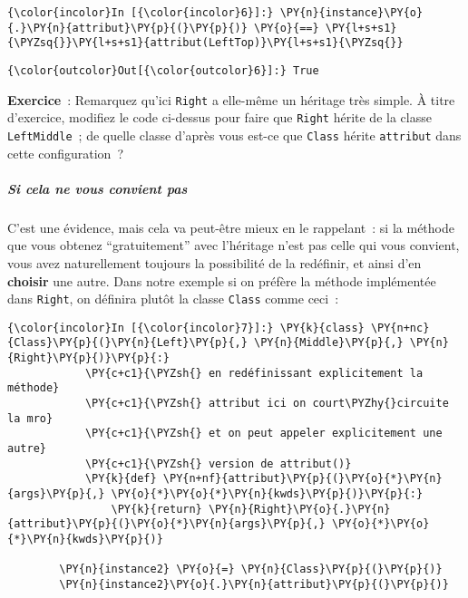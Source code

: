     \begin{Verbatim}[commandchars=\\\{\}]
{\color{incolor}In [{\color{incolor}6}]:} \PY{n}{instance}\PY{o}{.}\PY{n}{attribut}\PY{p}{(}\PY{p}{)} \PY{o}{==} \PY{l+s+s1}{\PYZsq{}}\PY{l+s+s1}{attribut(LeftTop)}\PY{l+s+s1}{\PYZsq{}}
\end{Verbatim}


\begin{Verbatim}[commandchars=\\\{\}]
{\color{outcolor}Out[{\color{outcolor}6}]:} True
\end{Verbatim}
            
    \textbf{Exercice}~: Remarquez qu'ici \texttt{Right} a elle-même un
héritage très simple. À titre d'exercice, modifiez le code ci-dessus
pour faire que \texttt{Right} hérite de la classe \texttt{LeftMiddle}~;
de quelle classe d'après vous est-ce que \texttt{Class} hérite
\texttt{attribut} dans cette configuration~?

    \hypertarget{si-cela-ne-vous-convient-pas}{%
\subparagraph{Si cela ne vous convient
pas}\label{si-cela-ne-vous-convient-pas}}

    C'est une évidence, mais cela va peut-être mieux en le rappelant~: si la
méthode que vous obtenez ``gratuitement'' avec l'héritage n'est pas
celle qui vous convient, vous avez naturellement toujours la possibilité
de la redéfinir, et ainsi d'en \textbf{choisir} une autre. Dans notre
exemple si on préfère la méthode implémentée dans \texttt{Right}, on
définira plutôt la classe \texttt{Class} comme ceci~:

    \begin{Verbatim}[commandchars=\\\{\}]
{\color{incolor}In [{\color{incolor}7}]:} \PY{k}{class} \PY{n+nc}{Class}\PY{p}{(}\PY{n}{Left}\PY{p}{,} \PY{n}{Middle}\PY{p}{,} \PY{n}{Right}\PY{p}{)}\PY{p}{:}
            \PY{c+c1}{\PYZsh{} en redéfinissant explicitement la méthode}
            \PY{c+c1}{\PYZsh{} attribut ici on court\PYZhy{}circuite la mro}
            \PY{c+c1}{\PYZsh{} et on peut appeler explicitement une autre}
            \PY{c+c1}{\PYZsh{} version de attribut()}
            \PY{k}{def} \PY{n+nf}{attribut}\PY{p}{(}\PY{o}{*}\PY{n}{args}\PY{p}{,} \PY{o}{*}\PY{o}{*}\PY{n}{kwds}\PY{p}{)}\PY{p}{:}
                \PY{k}{return} \PY{n}{Right}\PY{o}{.}\PY{n}{attribut}\PY{p}{(}\PY{o}{*}\PY{n}{args}\PY{p}{,} \PY{o}{*}\PY{o}{*}\PY{n}{kwds}\PY{p}{)}
            
        \PY{n}{instance2} \PY{o}{=} \PY{n}{Class}\PY{p}{(}\PY{p}{)}
        \PY{n}{instance2}\PY{o}{.}\PY{n}{attribut}\PY{p}{(}\PY{p}{)}
\end{Verbatim}


